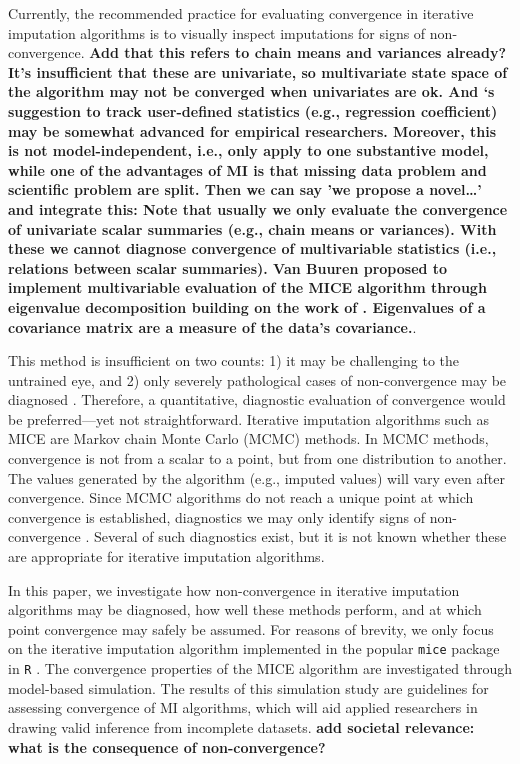 \documentclass[Royal,times,sageh]{sagej}
\begin{document}
Currently, the recommended practice for evaluating convergence in
iterative imputation algorithms is to visually inspect imputations for
signs of non-convergence. \textbf{Add that this refers to chain means
and variances already? It's insufficient that these are univariate, so
multivariate state space of the algorithm may not be converged when
univariates are ok. And \citet{buur18}`s suggestion to track
user-defined statistics (e.g., regression coefficient) may be somewhat
advanced for empirical researchers. Moreover, this is not
model-independent, i.e., only apply to one substantive model, while one
of the advantages of MI is that missing data problem and scientific
problem are split. Then we can say 'we propose a novel\ldots{}' and
integrate this: Note that usually we only evaluate the convergence of
univariate scalar summaries (e.g., chain means or variances). With these
we cannot diagnose convergence of multivariable statistics (i.e.,
relations between scalar summaries). Van Buuren \citeyearpar[\(\S\)
4.5.2]{buur18} proposed to implement multivariable evaluation of the
MICE algorithm through eigenvalue decomposition building on the work of
\citet{mack03}. Eigenvalues of a covariance matrix are a measure of the
data's covariance.}.

This method is insufficient on two counts: 1) it may be challenging to
the untrained eye, and 2) only severely pathological cases of
non-convergence may be diagnosed \citep[\(\S\) 6.5.2]{buur18}.
Therefore, a quantitative, diagnostic evaluation of convergence would be
preferred---yet not straightforward. Iterative imputation algorithms
such as MICE are Markov chain Monte Carlo (MCMC) methods. In MCMC
methods, convergence is not from a scalar to a point, but from one
distribution to another. The values generated by the algorithm (e.g.,
imputed values) will vary even after convergence. Since MCMC algorithms
do not reach a unique point at which convergence is established,
diagnostics we may only identify signs of non-convergence
\citep{hoff09}. Several of such diagnostics exist, but it is not known
whether these are appropriate for iterative imputation algorithms.

In this paper, we investigate how non-convergence in iterative
imputation algorithms may be diagnosed, how well these methods perform,
and at which point convergence may safely be assumed. For reasons of
brevity, we only focus on the iterative imputation algorithm implemented
in the popular \texttt{mice} package \citep{mice} in \texttt{R}
\citep{R}. The convergence properties of the MICE algorithm are
investigated through model-based simulation. The results of this
simulation study are guidelines for assessing convergence of MI
algorithms, which will aid applied researchers in drawing valid
inference from incomplete datasets. \textbf{add societal relevance: what
is the consequence of non-convergence?}
\end{document}

